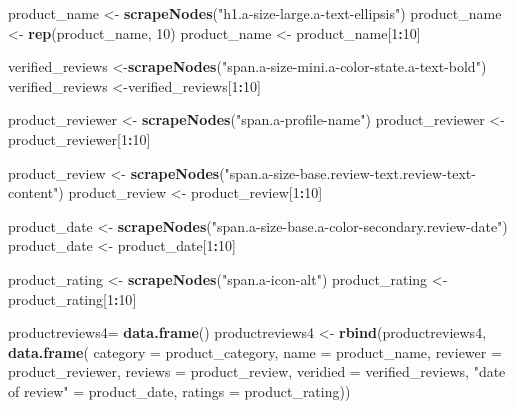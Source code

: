 \documentclass[
]{article}
\newenvironment{Shaded}{\begin{snugshade}}{\end{snugshade}}
\newcommand{\AttributeTok}[1]{\textcolor[rgb]{0.13,0.29,0.53}{#1}}
\newcommand{\DecValTok}[1]{\textcolor[rgb]{0.00,0.00,0.81}{#1}}
\newcommand{\FunctionTok}[1]{\textcolor[rgb]{0.13,0.29,0.53}{\textbf{#1}}}
\newcommand{\NormalTok}[1]{#1}
\newcommand{\OtherTok}[1]{\textcolor[rgb]{0.56,0.35,0.01}{#1}}
\newcommand{\SpecialCharTok}[1]{\textcolor[rgb]{0.81,0.36,0.00}{\textbf{#1}}}
\newcommand{\StringTok}[1]{\textcolor[rgb]{0.31,0.60,0.02}{#1}}
\begin{document}
\begin{Shaded}
\begin{Highlighting}[]
\NormalTok{  product\_name }\OtherTok{\textless{}{-}} \FunctionTok{scrapeNodes}\NormalTok{(}\StringTok{"h1.a{-}size{-}large.a{-}text{-}ellipsis"}\NormalTok{)}
\NormalTok{  product\_name }\OtherTok{\textless{}{-}} \FunctionTok{rep}\NormalTok{(product\_name, }\DecValTok{10}\NormalTok{)}
\NormalTok{  product\_name }\OtherTok{\textless{}{-}}\NormalTok{ product\_name[}\DecValTok{1}\SpecialCharTok{:}\DecValTok{10}\NormalTok{]}
  
\NormalTok{  verified\_reviews }\OtherTok{\textless{}{-}}\FunctionTok{scrapeNodes}\NormalTok{(}\StringTok{"span.a{-}size{-}mini.a{-}color{-}state.a{-}text{-}bold"}\NormalTok{)}
\NormalTok{  verified\_reviews }\OtherTok{\textless{}{-}}\NormalTok{verified\_reviews[}\DecValTok{1}\SpecialCharTok{:}\DecValTok{10}\NormalTok{]}
  
\NormalTok{  product\_reviewer }\OtherTok{\textless{}{-}} \FunctionTok{scrapeNodes}\NormalTok{(}\StringTok{"span.a{-}profile{-}name"}\NormalTok{)}
\NormalTok{  product\_reviewer }\OtherTok{\textless{}{-}}\NormalTok{ product\_reviewer[}\DecValTok{1}\SpecialCharTok{:}\DecValTok{10}\NormalTok{]}
  
\NormalTok{  product\_review }\OtherTok{\textless{}{-}} \FunctionTok{scrapeNodes}\NormalTok{(}\StringTok{"span.a{-}size{-}base.review{-}text.review{-}text{-}content"}\NormalTok{)}
\NormalTok{  product\_review }\OtherTok{\textless{}{-}}\NormalTok{ product\_review[}\DecValTok{1}\SpecialCharTok{:}\DecValTok{10}\NormalTok{]}
  
\NormalTok{  product\_date }\OtherTok{\textless{}{-}} \FunctionTok{scrapeNodes}\NormalTok{(}\StringTok{"span.a{-}size{-}base.a{-}color{-}secondary.review{-}date"}\NormalTok{)}
\NormalTok{  product\_date }\OtherTok{\textless{}{-}}\NormalTok{ product\_date[}\DecValTok{1}\SpecialCharTok{:}\DecValTok{10}\NormalTok{]}
  
\NormalTok{  product\_rating }\OtherTok{\textless{}{-}} \FunctionTok{scrapeNodes}\NormalTok{(}\StringTok{"span.a{-}icon{-}alt"}\NormalTok{)}
\NormalTok{  product\_rating }\OtherTok{\textless{}{-}}\NormalTok{ product\_rating[}\DecValTok{1}\SpecialCharTok{:}\DecValTok{10}\NormalTok{]}
  
\NormalTok{  productreviews4}\OtherTok{=} \FunctionTok{data.frame}\NormalTok{()}
\NormalTok{  productreviews4 }\OtherTok{\textless{}{-}} \FunctionTok{rbind}\NormalTok{(productreviews4, }\FunctionTok{data.frame}\NormalTok{(}
                      \AttributeTok{category =}\NormalTok{ product\_category,}
                      \AttributeTok{name =}\NormalTok{ product\_name,}
                      \AttributeTok{reviewer =}\NormalTok{ product\_reviewer,}
                      \AttributeTok{reviews =}\NormalTok{ product\_review,}
                      \AttributeTok{veridied =}\NormalTok{ verified\_reviews,}
                      \StringTok{"date of review"} \OtherTok{=}\NormalTok{ product\_date,}
                      \AttributeTok{ratings =}\NormalTok{ product\_rating))}
  

\end{Highlighting}
\end{Shaded}
\end{document}
